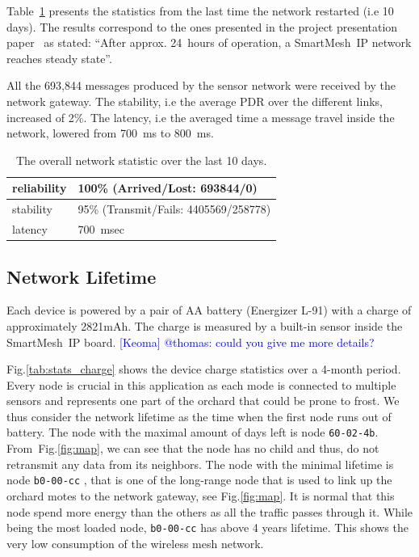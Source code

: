 \documentclass{sig-alternate}
\newcommand{\keoma}[1]       {\textcolor{blue}{[Keoma] #1}}
\newcommand{\smip}                {SmartMesh~IP\xspace}
\begin{document}

Table~\ref{tab:net_stats} presents the statistics from the last time the network restarted (i.e 10 days).
The results correspond to the ones presented in the project presentation paper~\cite{watteyne16peach} as stated:
``After approx. 24~hours of operation, a \smip network reaches steady state''.

All the 693,844 messages produced by the sensor network were received by the network gateway.
The stability, i.e the average PDR over the different links, increased of 2\%.
The latency, i.e the averaged time a message travel inside the network, lowered from 700~ms to 800~ms.

\begin{table}
    \begin{tabular}{|l|l|}
        \hline
        reliability & 100\% (Arrived/Lost:   693844/0)\\ \hline
        stability   & 95\% (Transmit/Fails: 4405569/258778)\\ \hline
        latency     & 700~msec\\
        \hline
    \end{tabular}
    \caption{The overall network statistic over the last 10 days.}
    \label{tab:net_stats}
\end{table}

\subsection{Network Lifetime}
\label{sec:lifetime}


Each device is powered by a pair of AA battery (Energizer L-91) with a charge of approximately 2821mAh.
The charge is measured by a built-in sensor inside the \smip board. \keoma{@thomas: could you give me more details?}


Fig.\ref{tab:stats_charge} shows the device charge statistics over a 4-month period.
Every node is crucial in this application as each mode is connected to multiple sensors and represents one part of the orchard that could be prone to frost.
We thus consider the network lifetime as the time when the first node runs out of battery.
The node with the maximal amount of days left is node {\tt 60-02-4b}.
From~Fig.\ref{fig:map}, we can see that the node has no child and thus, do not retransmit any data from its neighbors.
The node with the minimal lifetime is node {\tt b0-00-cc} , that is one of the long-range node that is used to link up the orchard motes to the network gateway, see Fig.\ref{fig:map}.
It is normal that this node spend more energy than the others as all the traffic passes through it.
While being the most loaded node, {\tt b0-00-cc} has above 4 years lifetime.
This shows the very low consumption of the wireless mesh network.
\end{document}

